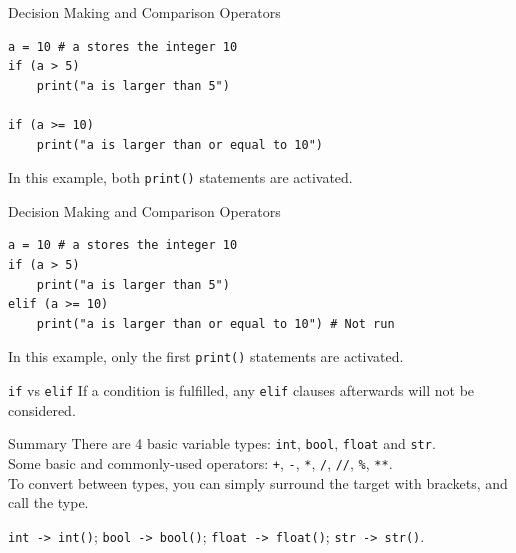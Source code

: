 \documentclass[dvipsnames, svgnames, x11names]{beamer}
\begin{document}
\begin{frame}[fragile]{Decision Making and Comparison Operators}
\begin{verbatim}
a = 10 # a stores the integer 10
if (a > 5)
	print("a is larger than 5")

if (a >= 10)
	print("a is larger than or equal to 10")
\end{verbatim}

\vspace{1em}
In this example, both \texttt{print()} statements are activated.
\end{frame}

\begin{frame}[fragile]{Decision Making and Comparison Operators}
\begin{verbatim}
a = 10 # a stores the integer 10
if (a > 5)
	print("a is larger than 5")
elif (a >= 10)
	print("a is larger than or equal to 10") # Not run
\end{verbatim}

\pause
\vspace{1em}
In this example, only the first \texttt{print()} statements are activated.

\begin{block}{\texttt{if} vs \texttt{elif}}
If a condition is fulfilled, any \texttt{elif} clauses afterwards will not be considered.
\end{block}
\end{frame}



\begin{frame}[fragile]{Summary}
There are 4 basic variable types: \texttt{int}, \texttt{bool}, \texttt{float} and \texttt{str}.\\
Some basic and commonly-used operators: \texttt{+}, \texttt{-}, \texttt{*}, \texttt{/}, \texttt{//}, \texttt{\%}, \texttt{**}.\\

\noindent To convert between types, you can simply surround the target with brackets, and call the type.


\texttt{int -> int()}; \texttt{bool -> bool()}; \texttt{float -> float()}; \texttt{str -> str()}.
\end{frame}
\end{document}
